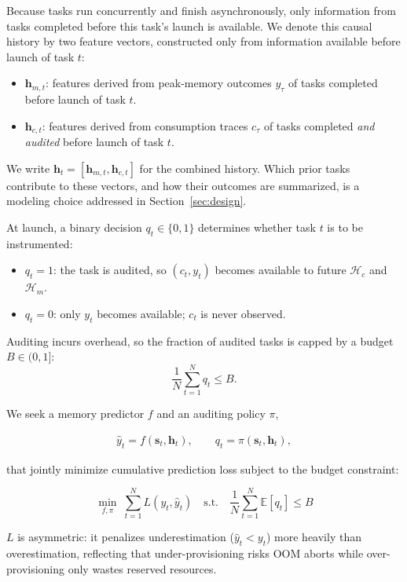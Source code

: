 Because tasks run concurrently and finish asynchronously, only information
from tasks completed before this task's launch is available. We denote this
causal history by two feature vectors, constructed only from information
available before launch of task $t$:

\begin{itemize}
\item $\mathbf{h}_{m,t}$: features derived from peak-memory outcomes
$y_\tau$ of tasks completed before launch of task $t$.
\item $\mathbf{h}_{c,t}$: features derived from consumption traces $c_\tau$
of tasks completed \emph{and audited} before launch of task $t$.
\end{itemize}

We write $\mathbf{h}_t = [\mathbf{h}_{m,t}, \mathbf{h}_{c,t}]$ for the
combined history. Which prior tasks contribute to these vectors, and how
their outcomes are summarized, is a modeling choice addressed in
Section~\ref{sec:design}.


At launch, a binary decision $q_t \in \{0,1\}$ determines whether task $t$ is to be instrumented:

\begin{itemize}
\item $q_t = 1$: the task is audited, so $(c_t, y_t)$ becomes available to future $\mathcal{H}_c$ and $\mathcal{H}_m$.
\item $q_t = 0$: only $y_t$ becomes available; $c_t$ is never observed.
\end{itemize}

Auditing incurs overhead, so the fraction of audited tasks is capped by a budget $B \in (0,1]$:
$$\frac{1}{N} \sum_{t=1}^{N} q_t \le B.$$

We seek a memory predictor $f$ and an auditing policy $\pi$,


$$\begin{aligned}
\hat{y}_t = f(\mathbf{s}_t, \mathbf{h}_t), \qquad
q_t = \pi(\mathbf{s}_t, \mathbf{h}_t),
\end{aligned}$$

that jointly minimize cumulative prediction loss subject to the budget constraint:

\begin{equation}
\min_{f,\pi} \; \sum_{t=1}^{N} L(y_t, \hat{y}_t) \quad \text{s.t.} \quad \frac{1}{N}\sum_{t=1}^N \mathbb{E}[q_t] \le B
\end{equation}

$L$ is asymmetric: it penalizes underestimation ($\hat{y}_t < y_t$) more heavily than overestimation, reflecting that under-provisioning risks OOM aborts while over-provisioning only wastes reserved resources.



